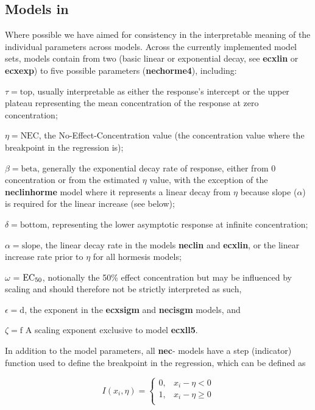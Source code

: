\documentclass[
  shortnames]{jss}
\begin{document}
\subsection[Models in bayesnec]{Models in }\label{mdbnc}

Where possible we have aimed for consistency in the interpretable meaning of the individual parameters across models. Across the currently implemented model sets, models contain from two (basic linear or exponential decay, see \textbf{ecxlin} or \textbf{ecxexp}) to five possible parameters (\textbf{nechorme4}), including:

\(\tau = \text{top}\), usually interpretable as either the response's intercept or the upper plateau representing the mean concentration of the response at zero concentration;

\(\eta = \text{NEC}\), the No-Effect-Concentration value (the concentration value where the breakpoint in the regression is);

\(\beta = \text{beta}\), generally the exponential decay rate of response, either from 0 concentration or from the estimated \(\eta\) value, with the exception of the \textbf{neclinhorme} model where it represents a linear decay from \(\eta\) because slope (\(\alpha\)) is required for the linear increase (see below);

\(\delta = \text{bottom}\), representing the lower asymptotic response at infinite concentration;

\(\alpha = \text{slope}\), the linear decay rate in the models \textbf{neclin} and \textbf{ecxlin}, or the linear increase rate prior to \(\eta\) for all hormesis models;

\(\omega\) = \(\text{EC\textsubscript{50}}\), notionally the 50\% effect concentration but may be influenced by scaling and should therefore not be strictly interpreted as such,

\(\epsilon = \text{d}\), the exponent in the \textbf{ecxsigm} and \textbf{necisgm} models, and

\(\zeta = \text{f}\) A scaling exponent exclusive to model \textbf{ecxll5}.

In addition to the model parameters, all \textbf{nec}- models have a step (indicator) function used to define the breakpoint in the regression, which can be defined as

\[
I(x_i, \eta) = \begin{cases} 
      0, & x_i - \eta < 0 \\
      1, & x_i - \eta \geq 0 \\
   \end{cases}
\]
\end{document}
